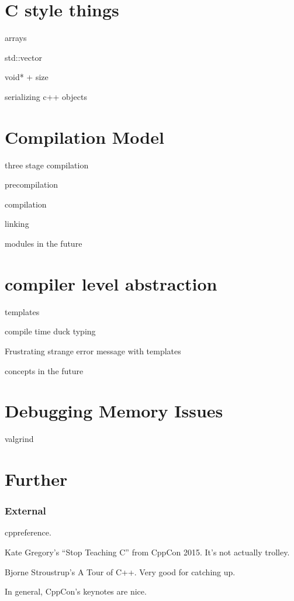 \documentclass[aspectratio=169]{beamer}
\begin{document}
\section{C style things}

\begin{frame}
  arrays

  std::vector

  void* + size

  serializing c++ objects
\end{frame}



\section{Compilation Model}

\begin{frame}
  three stage compilation

  precompilation

  compilation

  linking  
\end{frame}

\begin{frame}
  modules in the future
\end{frame}




\section{compiler level abstraction}

\begin{frame}
  templates
\end{frame}

\begin{frame}
  compile time duck typing
\end{frame}

\begin{frame}
  Frustrating strange error message with templates
\end{frame}

\begin{frame}
  concepts in the future
\end{frame}


\section{Debugging Memory Issues}


\begin{frame}
  valgrind
\end{frame}

\section{Further}

\begin{frame}
  \frametitle{External}

  \tiny

  cppreference. 

  Kate Gregory's ``Stop Teaching C'' from CppCon 2015.  It's not
  actually trolley.

  Bjorne Stroustrup's A Tour of C++. Very good for catching up.

  In general, CppCon's keynotes are nice.

\end{frame}
\end{document}
